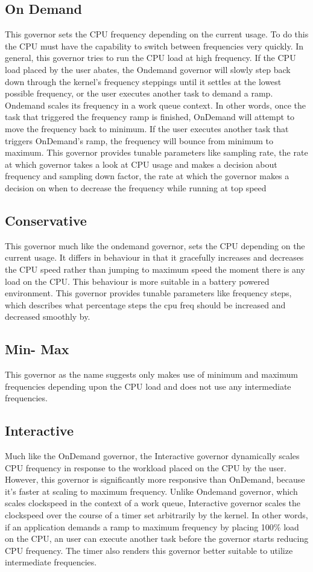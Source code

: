 \subsection{On Demand}
This governor sets the CPU frequency depending on the current usage. To do this the CPU must have the capability to switch between frequencies very quickly. In general, this governor tries to run the CPU load at high frequency. If the CPU load placed by the user abates, the Ondemand governor will slowly step back down through the kernel's frequency steppings until it settles at the lowest possible frequency, or the user executes another task to demand a ramp.
Ondemand scales its frequency in a work queue context. In other words, once the task that triggered the frequency ramp is finished, OnDemand will attempt to move the frequency back to minimum. If the user executes another task that triggers OnDemand's ramp, the frequency will bounce from minimum to maximum.
This governor provides tunable parameters like sampling rate, the rate at which governor takes a look at CPU usage and makes a decision about frequency and sampling down factor, the rate at which the governor makes a decision on when to decrease the frequency while running at top speed

\subsection{Conservative}
This governor much like the ondemand governor, sets the CPU depending on the current usage.  It differs in behaviour in that it gracefully increases and decreases the CPU speed rather than jumping to maximum speed the moment there is any load on the CPU. This behaviour is more suitable in a battery powered environment.
This governor provides tunable parameters like frequency steps, which describes what percentage steps the cpu freq should be increased and decreased smoothly by.

\subsection{Min- Max}
This governor as the name suggests only makes use of minimum and maximum frequencies depending upon the CPU load and does not use any intermediate frequencies.

\subsection{Interactive}
Much like the OnDemand governor, the Interactive governor dynamically scales CPU frequency in response to the workload placed on the CPU by the user. However, this governor is significantly more responsive than OnDemand, because it's faster at scaling to maximum frequency.
Unlike Ondemand governor, which scales clockspeed in the context of a work queue, Interactive governor scales the clockspeed over the course of a timer set arbitrarily by the kernel. In other words, if an application demands a ramp to maximum frequency by placing 100\% load on the CPU, an user can execute another task before the governor starts reducing CPU frequency. The timer also renders this governor better suitable to utilize intermediate frequencies.

